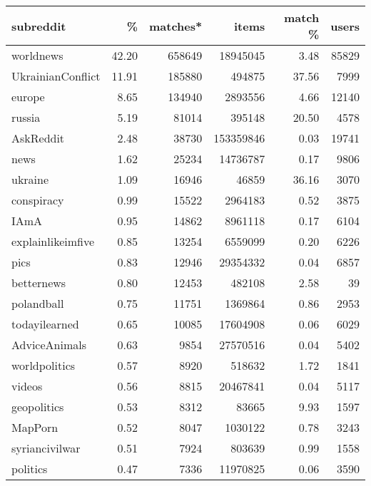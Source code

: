 \begin{tabular}{lrrrrr}
\toprule
subreddit &       \% &  matches* &       items &  match \% &   users \\
\midrule
worldnews           &   42.20 &   658649 &    18945045 &     3.48 &   85829 \\
UkrainianConflict   &   11.91 &   185880 &      494875 &    37.56 &    7999 \\
europe              &    8.65 &   134940 &     2893556 &     4.66 &   12140 \\
russia              &    5.19 &    81014 &      395148 &    20.50 &    4578 \\
AskReddit           &    2.48 &    38730 &   153359846 &     0.03 &   19741 \\
news                &    1.62 &    25234 &    14736787 &     0.17 &    9806 \\
ukraine             &    1.09 &    16946 &       46859 &    36.16 &    3070 \\
conspiracy          &    0.99 &    15522 &     2964183 &     0.52 &    3875 \\
IAmA                &    0.95 &    14862 &     8961118 &     0.17 &    6104 \\
explainlikeimfive   &    0.85 &    13254 &     6559099 &     0.20 &    6226 \\
pics                &    0.83 &    12946 &    29354332 &     0.04 &    6857 \\
betternews          &    0.80 &    12453 &      482108 &     2.58 &      39 \\
polandball          &    0.75 &    11751 &     1369864 &     0.86 &    2953 \\
todayilearned       &    0.65 &    10085 &    17604908 &     0.06 &    6029 \\
AdviceAnimals       &    0.63 &     9854 &    27570516 &     0.04 &    5402 \\
worldpolitics       &    0.57 &     8920 &      518632 &     1.72 &    1841 \\
videos              &    0.56 &     8815 &    20467841 &     0.04 &    5117 \\
geopolitics         &    0.53 &     8312 &       83665 &     9.93 &    1597 \\
MapPorn             &    0.52 &     8047 &     1030122 &     0.78 &    3243 \\
syriancivilwar      &    0.51 &     7924 &      803639 &     0.99 &    1558 \\
politics            &    0.47 &     7336 &    11970825 &     0.06 &    3590 \\

\end{tabular}
